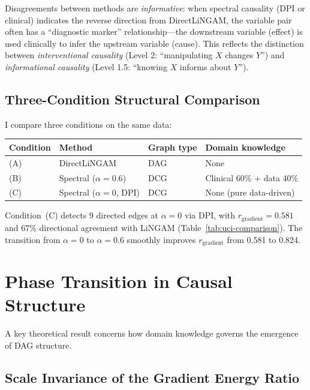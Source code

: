 \documentclass[twoside,11pt]{article}
\begin{document}
Disagreements between methods are \emph{informative}: when spectral
causality (DPI or clinical) indicates the reverse direction from
DirectLiNGAM, the variable pair often has a ``diagnostic marker''
relationship---the downstream variable (effect) is used clinically to
infer the upstream variable (cause).
This reflects the distinction between \emph{interventional causality}
(Level 2: ``manipulating $X$ changes $Y$'') and \emph{informational
causality} (Level 1.5: ``knowing $X$ informs about $Y$'').

\subsection{Three-Condition Structural Comparison}
\label{sec:three-condition}

I compare three conditions on the same data:

\begin{center}
\begin{tabular}{llll}
\toprule
Condition & Method & Graph type & Domain knowledge \\
\midrule
(A) & DirectLiNGAM & DAG & None \\
(B) & Spectral ($\alpha=0.6$) & DCG & Clinical 60\% + data 40\% \\
(C) & Spectral ($\alpha=0$, DPI) & DCG & None (pure data-driven) \\
\bottomrule
\end{tabular}
\end{center}

Condition~(C) detects 9 directed edges at $\alpha=0$ via DPI, with
$r_{\mathrm{gradient}}=0.581$ and 67\% directional agreement with
LiNGAM (Table~\ref{tab:uci-comparison}).  The transition from
$\alpha=0$ to $\alpha=0.6$ smoothly improves $r_{\mathrm{gradient}}$
from 0.581 to 0.824.

\section{Phase Transition in Causal Structure}
\label{sec:transition}

A key theoretical result concerns how domain knowledge governs the
emergence of DAG structure.

\subsection{Scale Invariance of the Gradient Energy Ratio}
\end{document}
